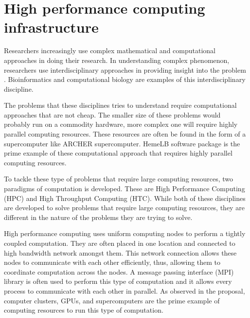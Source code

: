 \section{High performance computing infrastructure}

Researchers increasingly use complex mathematical and computational approaches in doing their research. In understanding complex phenomenon, researchers use interdisciplinary approaches in providing insight into the problem \citep{huerta2000nih}. Bioinformatics and computational biology are examples of this interdisciplinary discipline. 

The problems that these disciplines tries to understand require computational approaches that are not cheap. The smaller size of these problems would probably run on a commodity hardware, more complex one will require highly parallel computing resources. These resources are often be found in the form of a supercomputer like ARCHER supercomputer. HemeLB software package is the prime example of these computational approach that requires highly parallel computing resources.
 

%

To tackle these type of problems that require large computing resources, two paradigms of computation is developed. These are High Performance Computing (HPC) and High Throughput Computing (HTC).   While both of these disciplines are developed to solve problems that require large computing resources, they are different in the nature of the problems they are trying to solve.

High performance computing uses  uniform  computing nodes to perform a  tightly coupled computation. They are often placed in one location and connected to high bandwidth network amongst them. This network connection allows these nodes to communicate with each other efficiently, thus, allowing them to coordinate computation across the nodes\citep{Micro31:online}. A message passing interface (MPI) library is often used to perform this type of computation and it allows every process to communicate with each other in parallel. As observed in the proposal, computer clusters, GPUs, and supercomputers are the prime example of computing resources to run this type of computation.

